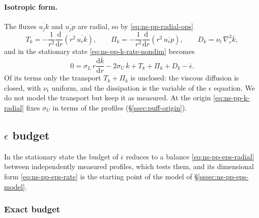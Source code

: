 \documentclass{article}
\begin{document}
\paragraph{Isotropic form.}
The fluxes $\overline{u_j k}$ and $\overline{u_j p}$ are radial, so by
\eqref{eq:ns-pp-radial-ops}
\begin{equation}\label{eq:ns-pp-k-radial-terms}
  T_k = -\frac{1}{r^2} \frac{\mathrm{d}}{\mathrm{d} r}\left( r^2\, \overline{u_r k} \right),
  \qquad
  \Pi_k = -\frac{1}{r^2} \frac{\mathrm{d}}{\mathrm{d} r}\left( r^2\, \overline{u_r p} \right),
  \qquad
  D_k = \nu_{\mathrm{t}}\, \nabla_r^2 \overline{k},
\end{equation}
and in the stationary state \eqref{eq:ns-pp-k-rate-nondim} becomes
\begin{equation}\label{eq:ns-pp-k-radial}
  0 = \sigma_L\, r \frac{\mathrm{d} \overline{k}}{\mathrm{d} r}
  - 2 \sigma_U\, \overline{k}
  + T_k + \Pi_k + D_k - \overline{\epsilon} .
\end{equation}
Of its terms only the transport $T_k + \Pi_k$ is unclosed: the viscous
diffusion is closed, with $\nu_{\mathrm{t}}$ uniform, and the dissipation is
the variable of the $\epsilon$ equation. We do not model the transport but keep
it as measured. At the origin \eqref{eq:ns-pp-k-radial} fixes $\sigma_U$
in terms of the profiles (\S\ref{ssec:puff-origin}).

\subsection{\texorpdfstring{$\epsilon$}{epsilon} budget}\label{ssec:ns-pp-eps-budget}
In the stationary state the budget of $\overline{\epsilon}$ reduces to a
balance \eqref{eq:ns-pp-eps-radial} between independently measured profiles,
which tests them, and its dimensional form \eqref{eq:ns-pp-eps-rate} is the
starting point of the model of \S\ref{sssec:ns-pp-eps-model}.

\subsubsection{Exact budget}\label{sssec:ns-pp-eps-exact}
\end{document}
